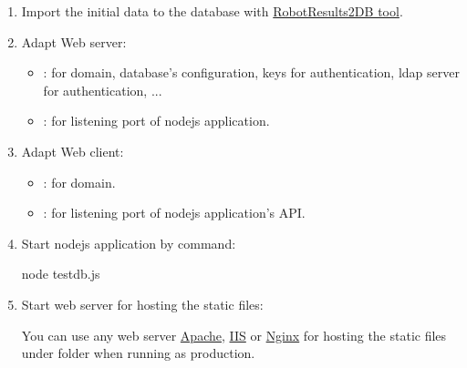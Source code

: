 \begin{enumerate}
\begin{itemize}
\begin{itemize}
\item create all store procedures by loading all SQL scripts under 
       folder then execute them.

\begin{boxhint}{Notice}
If you have created your schema with other name than the default 
name \emph{pjcmd\_bvt}, you should replace the schema name before executing SQL 
scripts.
\end{boxhint}

\end{itemize}

\end{itemize}

\item Import the initial data to the database with \href{https://github.com/test
-fullautomation/robotframework-testresultwebapptool}{RobotResults2DB tool}.

\item Adapt Web server:
\begin{itemize}
   \item {}: for domain, database's configuration,
         keys for authentication, ldap server for authentication, ...
   \item {}: for listening port of nodejs application.
\end{itemize}

\item Adapt Web client:
\begin{itemize}
   \item {}: for domain.
   \item {}: for 
         listening port of nodejs application's API.
\end{itemize}

\item Start nodejs application by command:
\begin{robotlog}
node testdb.js
\end{robotlog}

\item Start web server for hosting the static files:

You can use any web server \href{https://httpd.apache.org/}{Apache}, 
\href{https://www.iis.net/}{IIS} or \href{https://www.nginx.com/}{Nginx} for 
hosting the static files under  folder when running 
as production.


\end{enumerate}
